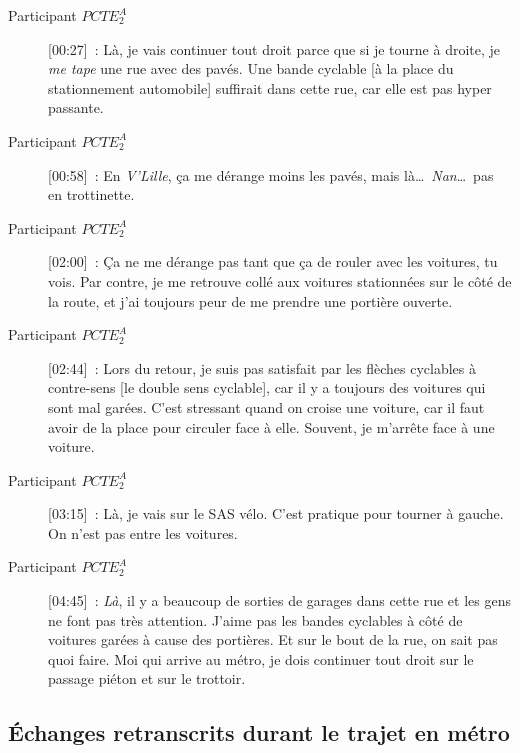 \begin{description}
    \item[Participant \(PCTE^{A}_{2}\)] [00:27]~: Là, je vais continuer tout droit parce que si je tourne à droite, je \textsl{me tape} une rue avec des pavés. Une bande cyclable [à la place du stationnement automobile] suffirait dans cette rue, car elle est pas hyper passante.
    \item[Participant \(PCTE^{A}_{2}\)] [00:58]~: En \textsl{V'Lille}, ça me dérange moins les pavés, mais là\dots~\textsl{Nan}\dots~pas en trottinette.
    \item[Participant \(PCTE^{A}_{2}\)] [02:00]~: Ça ne me dérange pas tant que ça de rouler avec les voitures, tu vois. Par contre, je me retrouve collé aux voitures stationnées sur le côté de la route, et j'ai toujours peur de me prendre une portière ouverte.
    \item[Participant \(PCTE^{A}_{2}\)] [02:44]~: Lors du retour, je suis pas satisfait par les flèches cyclables à contre-sens [le double sens cyclable], car il y a toujours des voitures qui sont mal garées. C'est stressant quand on croise une voiture, car il faut avoir de la place pour circuler face à elle. Souvent, je m'arrête face à une voiture.
    \item[Participant \(PCTE^{A}_{2}\)] [03:15]~: Là, je vais sur le SAS vélo. C'est pratique pour tourner à gauche. On n'est pas entre les voitures.
    \item[Participant \(PCTE^{A}_{2}\)] [04:45]~: \textsl{Là}, il y a beaucoup de sorties de garages dans cette rue et les gens ne font pas très attention. J'aime pas les bandes cyclables à côté de voitures garées à cause des portières. Et sur le bout de la rue, on sait pas quoi faire. Moi qui arrive au métro, je dois continuer tout droit sur le passage piéton et sur le trottoir.%
\end{description}

\subsection{Échanges retranscrits durant le trajet en métro}

